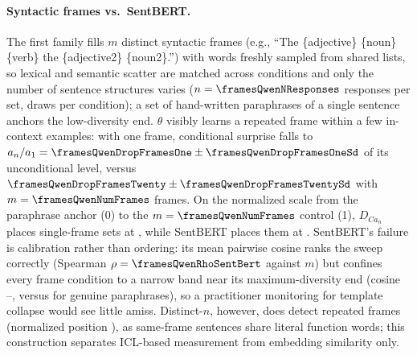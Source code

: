 \paragraph{Syntactic frames vs.\ SentBERT.}
The first family fills $m$ distinct syntactic frames (e.g., ``The \{adjective\} \{noun\} \{verb\} the \{adjective2\} \{noun2\}.'') with words freshly sampled from shared lists, so lexical and semantic scatter are matched across conditions and only the number of sentence structures varies ($n=\framesQwenNResponses$ responses per set, \framesQwenNDraws{} draws per condition); a set of hand-written paraphrases of a single sentence anchors the low-diversity end.
$\theta$ visibly learns a repeated frame within a few in-context examples: with one frame, conditional surprise falls to $a_n/a_1 = \framesQwenDropFramesOne \pm \framesQwenDropFramesOneSd$ of its unconditional level, versus $\framesQwenDropFramesTwenty \pm \framesQwenDropFramesTwentySd$ with $m=\framesQwenNumFrames$ frames.
On the normalized scale from the paraphrase anchor (0) to the $m=\framesQwenNumFrames$ control (1), $D_{Ca_n}$ places single-frame sets at \framesQwenNormDFramesOne, while SentBERT places them at \framesQwenNormSentBertFramesOne.
SentBERT's failure is calibration rather than ordering: its mean pairwise cosine ranks the sweep correctly (Spearman $\rho = \framesQwenRhoSentBert$ against $m$) but confines every frame condition to a narrow band near its maximum-diversity end (cosine \framesQwenCosFramesTwenty{}--\framesQwenCosFramesOne, versus \framesQwenCosParaphrase{} for genuine paraphrases), so a practitioner monitoring for template collapse would see little amiss.
Distinct-$n$, however, does detect repeated frames (normalized position \framesQwenNormDistinctFramesOne), as same-frame sentences share literal function words; this construction separates ICL-based measurement from embedding similarity only.

